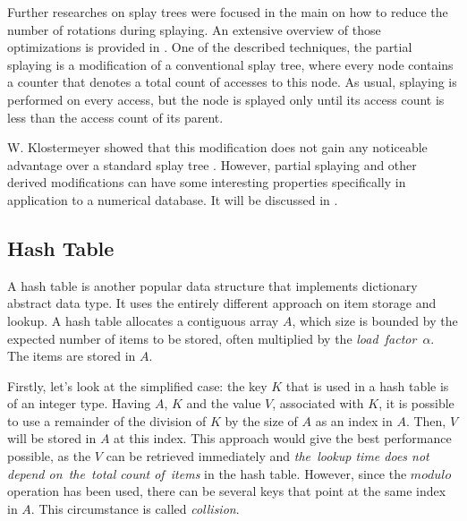 Further researches on splay trees were focused in the main on how to reduce the number of rotations during splaying. An extensive overview of those optimizations is provided in \cite{splay_overview}. One of the described techniques, the partial splaying is a modification of a conventional splay tree, where every node contains a counter that denotes a total count of accesses to this node. As usual, splaying is performed on every access, but the node is splayed only until its access count is less than the access count of its parent.

W. Klostermeyer showed that this modification does not gain any noticeable advantage over a standard splay tree \cite{partial_splaying}. However, partial splaying and other derived modifications can have some interesting properties specifically in application to a numerical database. It will be discussed in .

\subsection{Hash Table}

A hash table is another popular data structure that implements dictionary abstract data type. It uses the entirely different approach on item storage and lookup. A hash table allocates a contiguous array $A$, which size is bounded by the expected number of items to be stored, often multiplied by the \mbox{\emph{load~factor}~$\alpha$}. The items are stored in $A$.

Firstly, let’s look at the simplified case: the key $K$ that is used in a hash table is of an integer type. Having $A$, $K$ and the value $V$, associated with $K$, it is possible to use a remainder of the division of $K$ by the size of $A$ as an index in $A$. Then, $V$ will be stored in $A$ at this index. This approach would give the best performance possible, as the $V$ can be retrieved immediately and \emph{the~lookup time does not depend on~the~total count of~items} in the hash table. However, since the $modulo$ operation has been used, there can be several keys that point at the same index in $A$. This circumstance is called \emph{collision}.

